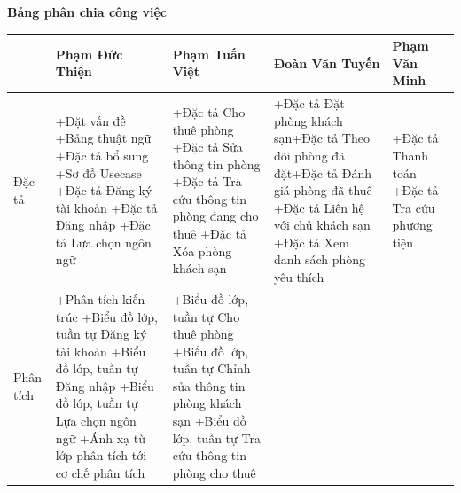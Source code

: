 \textbf{Bảng phân chia công việc}
\begin{longtable}{
    |p{1cm}
    |>{\raggedright\arraybackslash}p{3.5cm}
    |>{\raggedright\arraybackslash}p{3.5cm}
    |>{\raggedright\arraybackslash}p{3.5cm}
    |>{\raggedright\arraybackslash}p{3.5cm}|
}
\hline
 & Phạm Đức Thiện & Phạm Tuấn Việt & Đoàn Văn Tuyến & Phạm Văn Minh \\
\hline
Đặc tả & +Đặt vấn đề\newline 
        +Bảng thuật ngữ\newline 
        +Đặc tả bổ sung\newline 
        +Sơ đồ Usecase\newline
        +Đặc tả Đăng ký tài khoản\newline
        +Đặc tả Đăng nhập\newline
        +Đặc tả Lựa chọn ngôn ngữ\newline
       & +Đặc tả Cho thuê phòng\newline
       +Đặc tả Sửa thông tin phòng\newline
       +Đặc tả Tra cứu thông tin phòng đang cho thuê\newline
       +Đặc tả Xóa phòng khách sạn\newline
       & +Đặc tả Đặt phòng khách sạn\newline +Đặc tả Theo dõi phòng đã đặt\newline +Đặc tả Đánh giá phòng đã thuê\newline
       +Đặc tả Liên hệ với chủ khách sạn\newline
       +Đặc tả Xem danh sách phòng yêu thích\newline
       &+Đặc tả Thanh toán\newline
       +Đặc tả Tra cứu phương tiện\newline
\\
\hline
Phân tích 
&+Phân tích kiến trúc\newline
+Biểu đồ lớp, tuần tự Đăng ký tài khoản\newline
+Biểu đồ lớp, tuần tự Đăng nhập\newline
+Biểu đồ lớp, tuần tự Lựa chọn ngôn ngữ\newline
+Ánh xạ từ lớp phân tích tới cơ chế phân tích\newline
&+Biểu đồ lớp, tuần tự Cho thuê phòng\newline
+Biểu đồ lớp, tuần tự Chỉnh sửa thông tin phòng khách sạn\newline
+Biểu đồ lớp, tuần tự Tra cứu thông tin phòng cho thuê\newline

\end{longtable}
